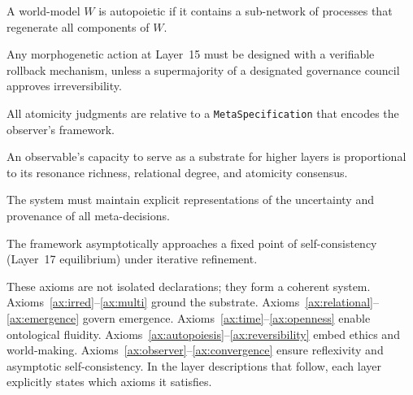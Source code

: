\begin{axiom}\label{ax:autopoiesis}
A world-model $W$ is autopoietic if it contains a sub-network of processes that regenerate all components of $W$.
\end{axiom}

\begin{axiom}\label{ax:reversibility}
Any morphogenetic action at Layer~15 must be designed with a verifiable rollback mechanism, unless a supermajority of a designated governance council approves irreversibility.
\end{axiom}

\begin{axiom}\label{ax:observer}
All atomicity judgments are relative to a \texttt{MetaSpecification} that encodes the observer's framework.
\end{axiom}

\begin{axiom}[Generativity]\label{ax:generativity}
An observable's capacity to serve as a substrate for higher layers is proportional to its resonance richness, relational degree, and atomicity consensus.
\end{axiom}

\begin{axiom}\label{ax:humility}
The system must maintain explicit representations of the uncertainty and provenance of all meta-decisions.
\end{axiom}

\begin{axiom}[Convergence]\label{ax:convergence}
The framework asymptotically approaches a fixed point of self-consistency (Layer~17 equilibrium) under iterative refinement.
\end{axiom}

These axioms are not isolated declarations; they form a coherent system. Axioms~\ref{ax:irred}--\ref{ax:multi} ground the substrate. Axioms~\ref{ax:relational}--\ref{ax:emergence} govern emergence. Axioms~\ref{ax:time}--\ref{ax:openness} enable ontological fluidity. Axioms~\ref{ax:autopoiesis}--\ref{ax:reversibility} embed ethics and world-making. Axioms~\ref{ax:observer}--\ref{ax:convergence} ensure reflexivity and asymptotic self-consistency. In the layer descriptions that follow, each layer explicitly states which axioms it satisfies.